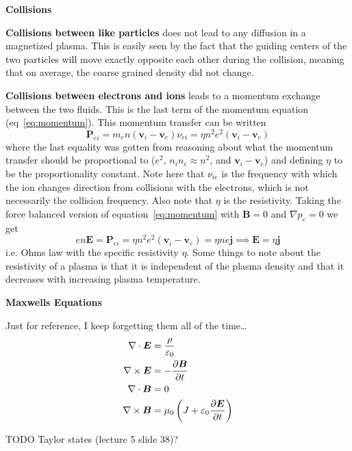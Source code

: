 \documentclass[10pt,landscape]{article}
\renewcommand{\vec}{\bm}
\newcommand{\topiccolor}{green}
\renewcommand{\section}[2]{%
	\renewcommand{\topiccolor}{#2}
	\begin{tcolorbox}[boxsep=0.5mm, left=1mm, right=1mm, top=0mm, bottom=0mm,
		colback=#2!30, colframe=#2, arc is angular]%
		\centering \textbf{#1}%
	\end{tcolorbox}%
	\nopagebreak%
}
\newcommand{\cbf}[1]{\textcolor{\topiccolor!80!black}{\textbf{#1}}}
\begin{document}
\begin{multicols*}{3}
\section{Collisions}{blue}

\cbf{Collisions between like particles} does not lead to any diffusion in a magnetized
plasma. This is easily seen by the fact that the guiding centers of the two
particles will move exactly opposite each other during the collision, meaning
that on average, the coarse grained density did not change.

\cbf{Collisions between electrons and ions} leads to a momentum exchange between the
two fluids. This is the last term of the momentum equation
(eq~\eqref{eq:momentum}).
This momentum transfer can be written
\begin{equation}
	\vec P_{ei} = m_e n (\vec v_i - \vec v_e) \nu_{ei}
	= \eta n^2 e^2 (\vec v_i - \vec v_e)
\end{equation}
where the last equality was gotten from reasoning about what the momentum
transfer should be proportional to
($e^2$, $n_in_e \approx n^2$, and $\vec v_i - \vec v_e$)
and defining $\eta$ to be the proportionality constant.
Note here that $\nu_{ie}$ is the frequency with which the ion changes
direction from collisions with the electrons, which is not necessarily the
collision frequency.
Also note that $\eta$ is the resistivity. 
Taking the force balanced version of equation~\eqref{eq:momentum} with
$\vec B = 0$ and $\nabla p_e = 0$ we get
\begin{equation}
	en \vec E = \vec P_{ei}
	= \eta n^2 e^2 (\vec v_i - \vec v_e)
	= \eta n e \vec j \implies \vec E = \eta \vec j
\end{equation}
i.e. Ohms law with the specific resistivity $\eta$.
Some things to note about the resistivity of a plasma is that it is independent
of the plasma density and that it decreases with increasing plasma temperature.


\section{Maxwells Equations}{gray}

Just for reference, I keep forgetting them all of the time\ldots
\begin{align*}
	\nabla \cdot \vec E &= \frac{\rho}{\varepsilon_0}\\
	\nabla \times \vec E &= -\diffp{\vec B}{t}\\
	\nabla \cdot \vec B &= 0\\
	\nabla \times \vec B &= \mu_0\left(J + \varepsilon_0 \diffp{\vec E}{t}\right)
\end{align*}

\end{multicols*}

TODO Taylor states (lecture 5 slide 38)?
\end{document}
